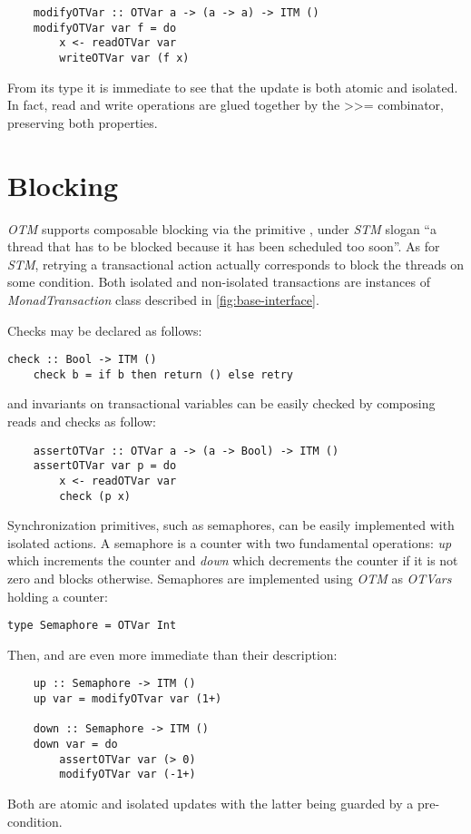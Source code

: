 \begin{Verbatim}
    modifyOTVar :: OTVar a -> (a -> a) -> ITM ()
    modifyOTVar var f = do
        x <- readOTVar var
        writeOTVar var (f x) 
\end{Verbatim}
From its type it is immediate to see that the update is both atomic and isolated. In fact, read and write operations are glued together by the \textgreater \textgreater= combinator, preserving both properties.

\section{Blocking}
\emph{OTM} supports composable blocking via the primitive , 
under \emph{STM} slogan ``a thread that has to be blocked because it has 
been scheduled too soon''. As for \emph{STM}, retrying a transactional action 
actually corresponds to block the threads on some condition. Both isolated and non-isolated transactions are instances of \emph{MonadTransaction} class described in \cref{fig:base-interface}.

Checks may be declared as follows:
\begin{Verbatim}[tabsize=3, xleftmargin=1ex, gobble=1]
    check :: Bool -> ITM ()
    check b = if b then return () else retry
\end{Verbatim}
and invariants on transactional variables can be easily checked by composing reads and checks as follow:
\begin{Verbatim}
    assertOTVar :: OTVar a -> (a -> Bool) -> ITM ()
    assertOTVar var p = do
        x <- readOTVar var
        check (p x)
\end{Verbatim}

Synchronization primitives, such as semaphores, can be easily implemented with isolated actions.
A semaphore is a counter with two fundamental operations: \emph{up} which increments the counter and \emph{down} which decrements the counter if it is not zero and blocks otherwise.
Semaphores are implemented using \emph{OTM} as \emph{OTVars} holding a counter:
\begin{Verbatim}[tabsize=3, xleftmargin=1ex, gobble=1]
    type Semaphore = OTVar Int
\end{Verbatim}
Then,  and  are even more immediate than their description:
\begin{Verbatim}
    up :: Semaphore -> ITM ()
    up var = modifyOTvar var (1+)

    down :: Semaphore -> ITM ()
    down var = do
        assertOTVar var (> 0)
        modifyOTVar var (-1+)
\end{Verbatim}
Both are atomic and isolated updates with the latter being guarded by a pre-condition.

